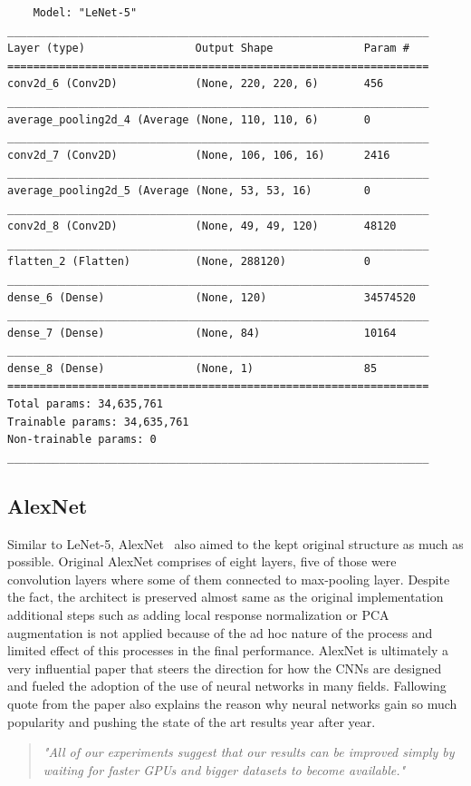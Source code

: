 \begin{verbatim}
    Model: "LeNet-5"
_________________________________________________________________
Layer (type)                 Output Shape              Param #   
=================================================================
conv2d_6 (Conv2D)            (None, 220, 220, 6)       456       
_________________________________________________________________
average_pooling2d_4 (Average (None, 110, 110, 6)       0         
_________________________________________________________________
conv2d_7 (Conv2D)            (None, 106, 106, 16)      2416      
_________________________________________________________________
average_pooling2d_5 (Average (None, 53, 53, 16)        0         
_________________________________________________________________
conv2d_8 (Conv2D)            (None, 49, 49, 120)       48120     
_________________________________________________________________
flatten_2 (Flatten)          (None, 288120)            0         
_________________________________________________________________
dense_6 (Dense)              (None, 120)               34574520  
_________________________________________________________________
dense_7 (Dense)              (None, 84)                10164     
_________________________________________________________________
dense_8 (Dense)              (None, 1)                 85        
=================================================================
Total params: 34,635,761
Trainable params: 34,635,761
Non-trainable params: 0
_________________________________________________________________
\end{verbatim}

\subsection{AlexNet}
Similar to LeNet-5, AlexNet~\cite{Alexnet} also aimed to the kept original structure as much as possible.
Original AlexNet comprises of eight layers, five of those were convolution layers where some of them connected to max-pooling layer. 
Despite the fact, the architect is preserved almost same as the original implementation additional steps such as adding local response normalization or PCA augmentation is not applied because of the ad hoc nature of the process and limited effect of this processes in the final performance.
AlexNet is ultimately a very influential paper that steers the direction for how the CNNs are designed and fueled the adoption of the use of neural networks in many fields.
Fallowing quote from the paper also explains the reason why neural networks gain so much popularity and pushing the state of the art results year after year.
\begin{quote}
    \textit{"All of our experiments suggest that our results
can be improved simply by waiting for faster GPUs and bigger datasets to become available."}
\end{quote}

